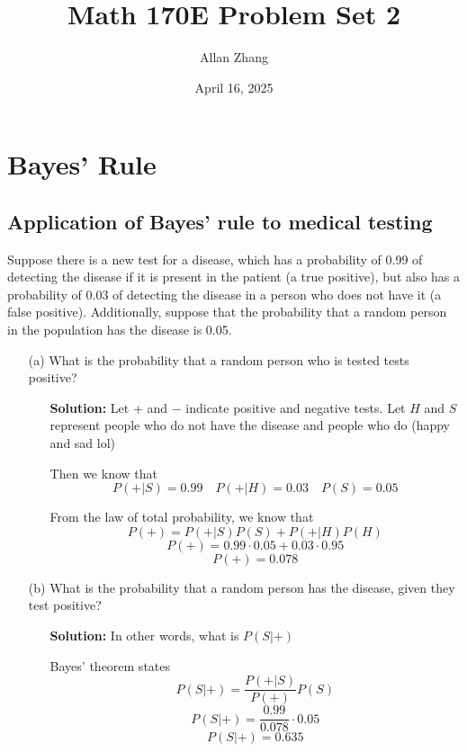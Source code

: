 \documentclass[hidelinks]{article}
\title{\textbf{Math 170E Problem Set 2}}
\author{Allan Zhang}
\date{April 16, 2025}
\begin{document}
\hypersetup{bookmarksnumbered=true,}
\pagecolor{white}
\color{black}
\maketitle 
\section{Bayes' Rule}
\subsection{Application of Bayes’ rule to medical testing}
Suppose there is a new test for a disease, which has a probability of 0.99 of detecting the
disease if it is present in the patient (a true positive), but also has a probability of 0.03
of detecting the disease in a person who does not have it (a false positive). Additionally,
suppose that the probability that a random person in the population has the disease is 0.05.
\begin{itemize}
    \item[(a)]  What is the probability that a random person who is tested tests positive?
    \begin{itemize}
        \item[ ] \textbf{Solution:} Let + and $-$ indicate positive and negative tests. Let $H$ and $S$ represent people who do not have the disease and people who do (happy and sad lol)
        \item[ ] Then we know that
        \[
            P(+|S) = 0.99 \quad P(+|H) = 0.03 \quad P(S)=0.05 
        \]
    \item[ ] From the law of total probability, we know that  
        \[
            P(+) = P(+|S)P(S) + P(+|H)P(H) 
        \]
        \[
            P(+) = 0.99\cdot 0.05 + 0.03 \cdot 0.95
        \]
        \[
            P(+) = 0.078
        \]
    \end{itemize}
    \item[(b)]  What is the probability that a random person has the disease, given they test positive?
    \begin{itemize}
        \item[ ] \textbf{Solution:} In other words, what is $P(S|+)$
        \item[ ] Bayes' theorem states 
        \[
            P(S|+) = \frac{P(+|S)}{P(+)}P(S)
        \]
        \[
            P(S|+) = \frac{0.99}{0.078}\cdot 0.05
        \]
        \[
            P(S|+) = 0.635
        \]
    \end{itemize}
\end{itemize}
\newpage
\end{document}
